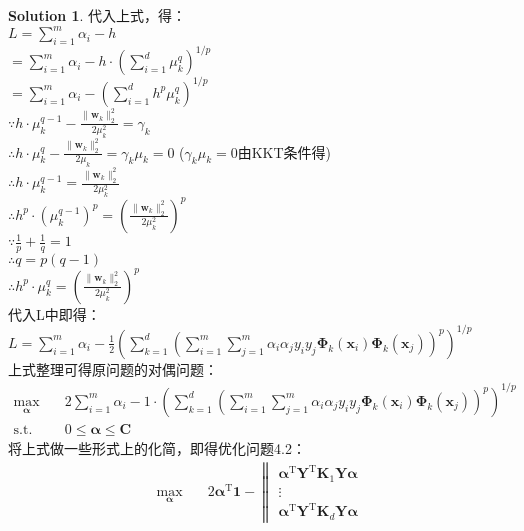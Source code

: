 \documentclass[a4paper,UTF8]{article}
\numberwithin{equation}{section}
\theoremstyle{definition}
\newtheorem*{solution}{Solution}
\begin{document}
\begin{solution}
代入上式，得：\\
$L = \sum_{i=1}^m \alpha_i - h$\\
$ = \sum_{i=1}^m \alpha_i - h \cdot (\sum_{i=1}^d \mu_k^q)^{1/p}$\\
$ = \sum_{i=1}^m \alpha_i - (\sum_{i=1}^d h^p\mu_k^q)^{1/p}$\\
$\because h \cdot \mu_k^{q-1} - \frac{\lVert \bm w_k \rVert^2_2}{2\mu_k^2} = \gamma_k $\\
$\therefore h \cdot \mu_k^q - \frac{\lVert \bm w_k \rVert^2_2}{2\mu_k} = \gamma_k \mu_k = 0$ ($\gamma_k \mu_k = 0$由KKT条件得)\\
$\therefore h \cdot \mu_k^{q-1} = \frac{\lVert \bm w_k \rVert^2_2}{2\mu_k^2}$\\
$\therefore h^p \cdot (\mu_k^{q-1})^p = (\frac{\lVert \bm w_k \rVert^2_2}{2\mu_k^2})^p$\\
$\because \frac{1}{p} + \frac{1}{q}  =1$\\
$\therefore q = p(q-1)$\\
$\therefore h^p \cdot \mu_k^q = (\frac{\lVert \bm w_k \rVert^2_2}{2\mu_k^2})^p$\\
代入L中即得：\\
$L =\sum_{i=1}^m \alpha_i - \frac{1}{2} \left(\sum_{k=1}^d  (\sum_{i=1}^m\sum_{j=1}^m \alpha_i\alpha_j y_i y_j \bm\Phi_k(\mathbf{x}_i) \bm\Phi_k(\mathbf{x}_j) )^p\right)^{1/p}$\\
上式整理可得原问题的对偶问题：\\
\begin{equation}
  \begin{split}
\max_{\bm \alpha} &\quad 2\sum_{i=1}^m \alpha_i - 1 \cdot \left(\sum_{k=1}^d \left( \sum_{i=1}^m\sum_{j=1}^m \alpha_i\alpha_j y_i y_j \bm\Phi_k(\mathbf{x}_i) \bm\Phi_k(\mathbf{x}_j)\right)^p\right)^{1/p}\\
  \text{s.t.} &\quad 0 \le \boldsymbol \alpha \le \mathbf{C}
  \end{split}
\end{equation}
将上式做一些形式上的化简，即得优化问题4.2：\\
\begin{equation}
  \begin{split}
\max_{\bm \alpha} &\quad 2\bm \alpha^\mathrm T \mathbf{1}- \left\lVert
 \begin{matrix}
   \bm \alpha^\mathrm{T}\mathbf Y^\mathrm{T} \mathbf K_1 \mathbf Y  \bm \alpha \\
   \vdots \\
  \bm \alpha^\mathrm{T}\mathbf Y^\mathrm{T} \mathbf K_d \mathbf Y  \bm \alpha 

\end{matrix}
\end{split}
\end{equation}
\end{solution}
\end{document}
